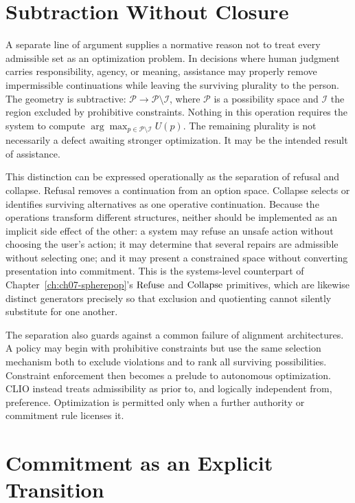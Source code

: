 \section{Subtraction Without Closure}

A separate line of argument supplies a normative reason not to treat every admissible set as an optimization problem. In decisions where human judgment carries responsibility, agency, or meaning, assistance may properly remove impermissible continuations while leaving the surviving plurality to the person. The geometry is subtractive: $\mathcal{P} \to \mathcal{P} \setminus \mathcal{I}$, where $\mathcal{P}$ is a possibility space and $\mathcal{I}$ the region excluded by prohibitive constraints. Nothing in this operation requires the system to compute $\arg\max_{p \in \mathcal{P}\setminus\mathcal{I}} U(p)$. The remaining plurality is not necessarily a defect awaiting stronger optimization. It may be the intended result of assistance.

This distinction can be expressed operationally as the separation of refusal and collapse. Refusal removes a continuation from an option space. Collapse selects or identifies surviving alternatives as one operative continuation. Because the operations transform different structures, neither should be implemented as an implicit side effect of the other: a system may refuse an unsafe action without choosing the user's action; it may determine that several repairs are admissible without selecting one; and it may present a constrained space without converting presentation into commitment. This is the systems-level counterpart of Chapter~\ref{ch:ch07-spherepop}'s $\mathrm{Refuse}$ and $\mathrm{Collapse}$ primitives, which are likewise distinct generators precisely so that exclusion and quotienting cannot silently substitute for one another.

The separation also guards against a common failure of alignment architectures. A policy may begin with prohibitive constraints but use the same selection mechanism both to exclude violations and to rank all surviving possibilities. Constraint enforcement then becomes a prelude to autonomous optimization. CLIO instead treats admissibility as prior to, and logically independent from, preference. Optimization is permitted only when a further authority or commitment rule licenses it.

\section{Commitment as an Explicit Transition}

